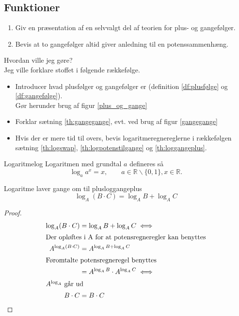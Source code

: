 \documentclass{article}
\begin{document}
\begin{tcolorbox}
    \section{Funktioner}
    \tcblower
    \begin{enumerate}
        \item Giv en præsentation af en selvvalgt del af teorien for plus- og gangefølger.
        \item Bevis at to gangefølger altid giver anledning til en potenssammenhæng.
    \end{enumerate}
\end{tcolorbox}

\begin{eksempel*}{Hvordan ville jeg gøre?}{}\\
    Jeg ville forklare stoffet i følgende rækkefølge.
    \begin{itemize}
        \item Introducer hvad plusfølger og gangefølger er 
            (definition \ref{df:plusfølge} og \ref{df:gangefølge}).\\
            Gør herunder brug af figur \ref{plus_og_gange} %
        \item Forklar sætning \ref{th:gangegange}, evt. ved brug af figur \ref{gangegange}
        \item Hvis der er mere tid til overs, bevis logaritmeregnereglerne i rækkefølgen
            sætning \ref{th:logswap}, \ref{th:logpotenstilgange} og \ref{th:loggangeplus}.
    \end{itemize}
\end{eksempel*}

\begin{definition}{Logaritme}{log}
    Logaritmen med grundtal $a$ defineres så
    \[
        \log_a{a^x} = x,\qquad a \in \mathbb{R}\backslash\{0, 1\}, x\in\mathbb{R}.
    \] 
\end{definition}

\begin{theorem}{Logaritme laver gange om til plus}{loggangeplus}
    \[\log_A(B \cdot C) = \log_AB + \log_AC\]
\end{theorem}

\begin{proof}
\begin{align*}
    \log_A(B \cdot C) &= \log_AB + \log_AC \iff\\
\intertext{Der opløftes i A for at potensregneregler kan benyttes}
    A^{\log_A(B \cdot C)} &= A^{\log_AB + \log_AC}\\
\intertext{Føromtalte potensregneregel benyttes}
                          &= A^{\log_AB} \cdot A^{\log_AC} \iff\\
\intertext{$A^{\log_A}$ går ud}
    B \cdot C &= B \cdot C\qedhere
\end{align*}
\end{proof}
\end{document}

